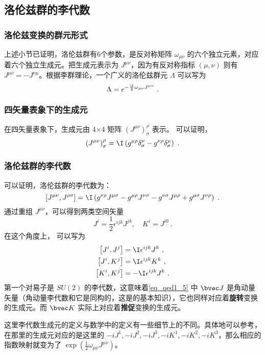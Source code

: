 \subsection{洛伦兹群的李代数}

\subsubsection{洛伦兹变换的群元形式}
上述小节已证明，洛伦兹群有6个参数，是反对称矩阵 $\omega_{\mu\nu}$ 的六个独立元素，对应着六个独立生成元。把生成元表示为 $J^{\mu\nu}$，因为有反对称指标 $(\mu,\nu)$ 则有 $J^{\mu\nu}=-J^{\nu\mu}$。根据李群理论，一个广义的洛伦兹群元 $\Lambda$ 可以写为
\begin{equation}
\Lambda=e^{-\frac{\I}{2} \omega_{\mu\nu}J^{\mu\nu}}~.
\end{equation}

\subsubsection{四矢量表象下的生成元}
在四矢量表象下，生成元由 4×4 矩阵 $(J^{\mu\nu})_\sigma^\rho$ 表示。
可以证明，
\begin{equation}\left(J^{\mu \nu}\right)_{\sigma}^{\rho}=\I\left(g^{\mu \rho} \delta_{\sigma}^{\nu}-g^{\nu \rho} \delta_{\sigma}^{\mu}\right)~.\end{equation}
\subsubsection{洛伦兹群的李代数}
可以证明，洛伦兹群的李代数为：
\begin{equation}\left[J^{\mu \nu}, J^{\rho \sigma}\right]=\I\left(g^{\nu \rho} J^{\mu \sigma}-g^{\mu \rho} J^{\nu \sigma}-g^{\nu \sigma} J^{\mu \rho}+g^{\mu \sigma} J^{\nu \rho}\right)~.\end{equation}
通过重组 $J^{\mu\nu}$，可以得到两类空间矢量
\begin{equation}\label{eq_qed1_5}J^{i}=\frac{1}{2} \epsilon^{i j k} J^{j k}, \quad K^{i}=J^{i 0}~.\end{equation}
在这个角度上， 可以写为
\begin{equation}\begin{aligned}
\left[J^{i}, J^{j}\right] &=\I \epsilon^{i j k} J^{k}~, \\
\left[J^{i}, K^{j}\right] &=\I \epsilon^{i j k} K^{k}~, \\
\left[K^{i}, K^{j}\right] &=-\I \epsilon^{i j k} J^{k}~.
\end{aligned}\end{equation}
第一个对易子是 $SU(2)$ 的李代数，这意味着\autoref{eq_qed1_5} 中 $\bvec J$ 是角动量矢量（角动量李代数和它是同构的，这是的基本知识），它也同样对应着\textbf{旋转}变换的生成元。而 $\bvec K$ 实际上对应着\textbf{推促}变换的生成元。

这里李代数生成元的定义与数学中的定义有一些细节上的不同。具体地可以参考，在那里的生成元对应的是这里的 $-iJ^1,-iJ^2,-iJ^3,-iK^1,-iK^2,-iK^3$，那么相应的指数映射就变为了 $\exp(\frac{1}{2}\omega_{\mu\nu}J^{\mu\nu})$。
